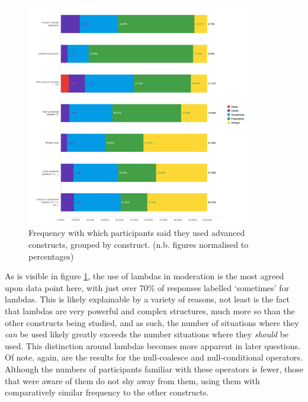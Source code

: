\documentclass{article}
\begin{document}
            \begin{figure}[htbp]
                \centering
                \includegraphics[width=0.9\textwidth]{freqUse}
                \caption{Frequency with which participants said they used advanced constructs, grouped by construct. (n.b. figures normalised to percentages)}
                \label{fig:freqUse}
            \end{figure}

            As is visible in figure \ref{fig:freqUse}, the use of lambdas in moderation is the most agreed upon data point here, with just over 70\% of responses labelled `sometimes' for lambdas. This is likely explainable by a variety of reasons, not least is the fact that lambdas are very powerful and complex structures, much more so than the other constructs being studied, and as such, the number of situations where they \emph{can} be used likely greatly exceeds the number situations where they \emph{should} be used. This distinction around lambdas becomes more apparent in later questions.
            Of note, again, are the results for the null-coalesce and null-conditional operators. Although the numbers of participants familiar with these operators is fewer, those that were aware of them do not shy away from them, using them with comparatively similar frequency to the other constructs.
\end{document}
